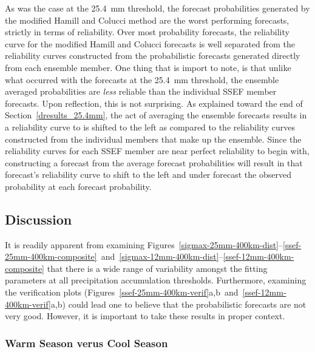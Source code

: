 As was the case at the \mbox{25.4 mm} threshold, the forecast probabilities generated by the modified Hamill and Colucci method are the worst performing forecasts, strictly in terms of reliability.
Over most probability forecasts, the reliability curve for the modified Hamill and Colucci forecasts is well separated from the reliability curves constructed from the probabilistic forecasts generated directly from each ensemble member.
One thing that is import to note, is that unlike what occurred with the forecasts at the \mbox{25.4 mm} threshold, the ensemble averaged probabilities are \emph{less} reliable than the individual SSEF member forecasts.
Upon reflection, this is not surprising. As explained toward the end of \mbox{Section \ref{dresults_25.4mm}}, the act of averaging the ensemble forecasts results in a reliability curve to is shifted to the left as compared to the reliability curves constructed from the individual members that make up the ensemble.
Since the reliability curves for each SSEF member are near perfect reliability to begin with, constructing a forecast from the average forecast probabilities will result in that forecast's reliability curve to shift to the left and under forecast the observed probability at each forecast probability.




\subsection{Discussion}
\label{ediscussion}

It is readily apparent from examining \mbox{Figures \ref{sigmax-25mm-400km-dist}--\ref{ssef-25mm-400km-composite} and \ref{sigmax-12mm-400km-dist}--\ref{ssef-12mm-400km-composite}} that there is a wide range of variability amongst the fitting parameters at all precipitation accumulation thresholds.
Furthermore, examining the verification plots (\mbox{Figures \ref{ssef-25mm-400km-verif}a,b and \ref{ssef-12mm-400km-verif}a,b}) could lead one to believe that the probabilistic forecasts are not very good.
However, it is important to take these results in proper context.




\subsubsection{Warm Season verus Cool Season}

